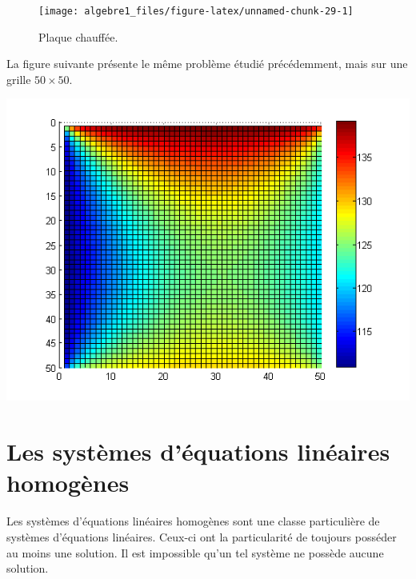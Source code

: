 \documentclass[]{book}
\theoremstyle{definition}
\theoremstyle{definition}
\theoremstyle{definition}
\theoremstyle{remark}
\begin{document}
\begin{figure}

{\centering \texttt{[image: algebre1\_files/figure-latex/unnamed-chunk-29-1]} 

}

\caption{Plaque chauffée.}\label{fig:unnamed-chunk-29}
\end{figure}

La figure suivante présente le même problème étudié précédemment, mais sur une grille \(50\times 50\).

\begin{center}\includegraphics[width=0.75\linewidth]{resources/images/grille_chaleur} \end{center}

\hypertarget{les-systemes-dequations-lineaires-homogenes}{%
\section{Les systèmes d'équations linéaires homogènes}\label{les-systemes-dequations-lineaires-homogenes}}

Les systèmes d'équations linéaires homogènes sont une classe particulière de systèmes d'équations linéaires. Ceux-ci ont la particularité de toujours posséder au moins une solution. Il est impossible qu'un tel système ne possède aucune solution.
\end{document}
